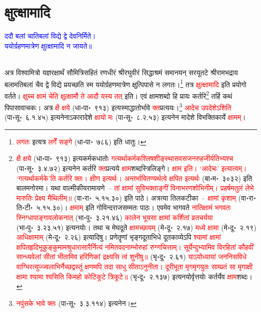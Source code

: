 \section[क्षुत्क्षामादि]{क्षुत्क्षामादि}
\centering\textcolor{blue}{ददौ बलां चातिबलां विद्ये द्वे देवनिर्मिते।\nopagebreak\\
ययोर्ग्रहणमात्रेण क्षुत्क्षामादि न जायते॥}\nopagebreak\\
\\
\begin{sloppypar}\justifying\noindent\hspace{10mm} अत्र विश्वामित्रो यज्ञ\-रक्षार्थं सौमित्रि\-सहितं रण\-धीरं श्रीरघु\-वीरं सिद्धाश्रमं समानयन् सरयू\-तटे श्रीरामभद्राय बलामतिबलां चैव द्वे विद्ये प्रयच्छति स्म ययोर्ग्रहणमात्रेण क्षुत्पिपासे न लगतः।\footnote{\textcolor{red}{लगतः} इत्यत्र \textcolor{red}{लगेँ सङ्गे} (धा॰पा॰~७८६) इति धातुः।} तत्र \textcolor{red}{क्षुत्क्षामादि} इति प्रयोगो वर्तते। \textcolor{red}{क्षुच्च क्षामं चेति क्षुत्क्षामौ ते आदौ यस्य तत्} इति। एवं क्षाम\-शब्दो हि प्रायः कर्तरि\footnote{\textcolor{red}{क्षै क्षये} (धा॰पा॰~९१३) इत्यकर्मक\-धातोः \textcolor{red}{गत्यर्थाकर्मक\-श्लिष\-शीङ्स्थास\-वस\-जन\-रुह\-जीर्यतिभ्यश्च} (पा॰सू॰~३.४.७२) इत्यनेन कर्तरि \textcolor{red}{क्त}\-प्रत्यये \textcolor{red}{क्षाम}\-शब्दस्त्रिलिङ्गे। \textcolor{red}{क्षाम इति। ‘आदेचः’ इत्यात्वम्। ‘गत्यर्थाकर्मके’ति कर्तरि क्तः। क्षीण इत्यर्थः। अन्तर्भावितण्यर्थत्वे क्षपित इत्यर्थः} (बा॰म॰~३०३२) इति बालमनोरमा। यथा वाल्मीकीय\-रामायणे~– \textcolor{red}{तां क्षामां सुविभक्ताङ्गीं विनाभरणशोभिनीम्। प्रहर्षमतुलं लेभे मारुतिः प्रेक्ष्य मैथिलीम्॥} (वा॰रा॰~५.१५.३०) इति पाठे। अत्रत्या तिलक\-टीका~– \textcolor{red}{क्षामां कृशाम्} (वा॰रा॰ ति॰टी॰~५.१५.३०)। \textcolor{red}{क्षमाम्} इति गोविन्दराज\-सम्मतः पाठः। एवमेव भागवते \textcolor{red}{नातिक्षामं भगवतः स्निग्धापाङ्गावलोकनात्} (भा॰पु॰~३.२१.४६) \textcolor{red}{कालेन भूयसा क्षामां कर्शितां व्रतचर्यया} (भा॰पु॰~३.२३.५१) इत्यनयोः। तथा च मेघदूते \textcolor{red}{क्षामच्छायम्} (मे॰दू॰~२.१७) \textcolor{red}{मध्ये क्षामा} (मे॰दू॰~२.१९) \textcolor{red}{आधिक्षामाम्} (मे॰दू॰~२.२६) इत्यादिषु। प्रणेतॄणां भृङ्गदूताभिधे दूतकाव्येऽपि \textcolor{red}{श्यामां क्षामां क्षपितहृदिभूकुङ्कुमामश्रुधारा\-सारैर्नित्यं नमितवदनाम्भोरुहां रुग्णचित्ताम्। सूर्येन्दुभ्यामिव विरहितां कौहवीं सान्ध्यवेलां सीतां भीतामिव हरिणिकां द्रक्ष्यसि त्वं शुनीषु॥} (भृ॰दू॰~२.६१) \textcolor{red}{याऽयोध्यायां जननिसविधे वाग्भिरत्युज्ज्वलाभिर्नैच्छद्वस्तुं क्षणमपि तदा साधु सीताऽनुनीता। दूरीभूता मृगमृगयुतः साम्प्रतं सा मृगाक्षी क्षामा श्यामा श्वसिति किमहो कोटिकूटे त्रिकूटे॥} (भृ॰दू॰~२.१३७) इत्यनयोर्वृत्तयोः कर्तर्येव \textcolor{red}{क्षाम}\-शब्दः।} तर्हि कथं पिपासा\-वाचकः। अत्र \textcolor{red}{क्षै क्षये} (धा॰पा॰~९१३) इत्यस्माद्धातोर्भावे \textcolor{red}{क्त}\-प्रत्ययः।\footnote{\textcolor{red}{नपुंसके भावे क्तः} (पा॰सू॰~३.३.११४) इत्यनेन।} \textcolor{red}{आदेच उपदेशेऽशिति} (पा॰सू॰~६.१.४५) इत्यनेनाऽकारादेशे \textcolor{red}{क्षायो मः} (पा॰सू॰~८.२.५३) इत्यनेन मादेशे विभक्ति\-कार्ये \textcolor{red}{क्षामम्}।\end{sloppypar}
